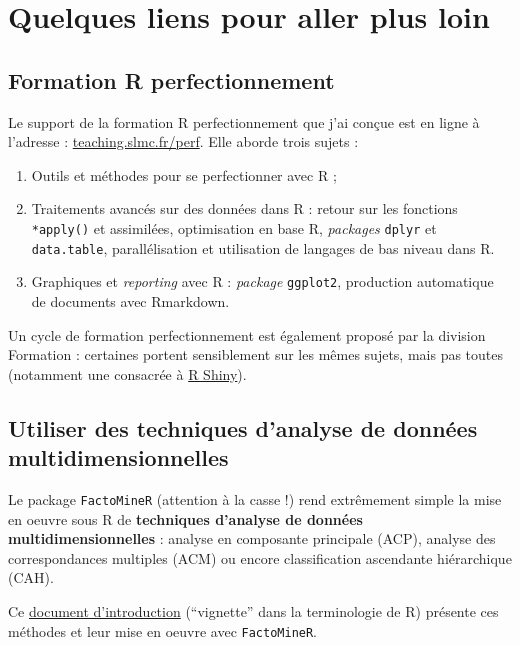 \documentclass[12pt,twosided, notitlepage]{book}
\begin{document}
\section{Quelques liens pour aller plus
loin}\label{quelques-liens-pour-aller-plus-loin}

\subsection{Formation R
perfectionnement}\label{formation-r-perfectionnement}

Le support de la formation R perfectionnement que j'ai conçue est en
ligne à l'adresse :
\href{http://teaching.slmc.fr/perf}{teaching.slmc.fr/perf}. Elle aborde
trois sujets :

\begin{enumerate}
\def\labelenumi{\arabic{enumi}.}
\item
  Outils et méthodes pour se perfectionner avec R ;
\item
  Traitements avancés sur des données dans R : retour sur les fonctions
  \texttt{*apply()} et assimilées, optimisation en base R,
  \emph{packages} \texttt{dplyr} et \texttt{data.table}, parallélisation
  et utilisation de langages de bas niveau dans R.
\item
  Graphiques et \emph{reporting} avec R : \emph{package}
  \texttt{ggplot2}, production automatique de documents avec Rmarkdown.
\end{enumerate}

Un cycle de formation perfectionnement est également proposé par la
division Formation : certaines portent sensiblement sur les mêmes
sujets, mais pas toutes (notamment une consacrée à
\href{https://shiny.rstudio.com/}{R Shiny}).

\subsection{Utiliser des techniques d'analyse de données
multidimensionnelles}\label{utiliser-des-techniques-danalyse-de-donnees-multidimensionnelles}

Le package \texttt{FactoMineR} (attention à la casse !) rend extrêmement
simple la mise en oeuvre sous R de \textbf{techniques d'analyse de
données multidimensionnelles} : analyse en composante principale (ACP),
analyse des correspondances multiples (ACM) ou encore classification
ascendante hiérarchique (CAH).

Ce
\href{https://cran.r-project.org/web/packages/FactoMineR/vignettes/FactoMineR.pdf}{document
d'introduction} (\enquote{vignette} dans la terminologie de R) présente
ces méthodes et leur mise en oeuvre avec \texttt{FactoMineR}.
\end{document}
